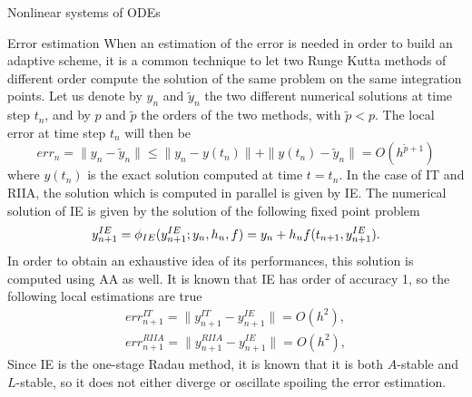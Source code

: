 \documentclass{article}
\begin{document}
\begin{section}{Nonlinear systems of ODEs}
\begin{subsection}{Error estimation}\label{subsec:errorestim}
When an estimation of the error is needed in order to build an adaptive scheme, it is a common technique to let two Runge Kutta methods of different order compute the solution of the same problem on the same integration points. Let us denote by $y_n$ and $\tilde{y}_n$ the two different numerical solutions at time step $t_n$, and by $p$ and $\tilde{p}$ the orders of the two methods, with $\tilde{p} < p$. The local error at time step $t_n$ will then be 
\begin{equation*}
	err_n = \|y_{n} - \tilde{y}_{n}\| \leq \|y_{n} - y(t_{n})\| + \|y(t_{n}) - \tilde{y}_{n}\| = O(h^{\tilde{p}+1})
\end{equation*} 
where $y(t_{n})$ is the exact solution computed at time $t = t_{n}$. In the case of IT and RIIA, the solution which is computed in parallel is given by IE. The numerical solution of IE is given by the solution of the following fixed point problem 
\begin{equation*}
	y_{n+1}^{IE} = \phi_{IE}(y_{n+1}^{IE}; y_n, h_n, f) = y_n + h_n f(t_{n+1},y_{n+1}^{IE}). \\
\end{equation*}
In order to obtain an exhaustive idea of its performances, this solution is computed using AA as well. It is known that IE has order of accuracy 1, so the following local estimations are true
\begin{equation*}
\begin{aligned}
	err_{n+1}^{IT} = \|y_{n+1}^{IT} - y_{n+1}^{IE}\| = O(h^{2}), \\
	err_{n+1}^{RIIA} = \|y_{n+1}^{RIIA} - y_{n+1}^{IE}\| = O(h^{2}),
\end{aligned}
\end{equation*}
Since IE is the one-stage Radau method, it is known that it is both $A$-stable and $L$-stable, so it does not either diverge or oscillate spoiling the error estimation.
\end{subsection}


\end{section}
\end{document}
